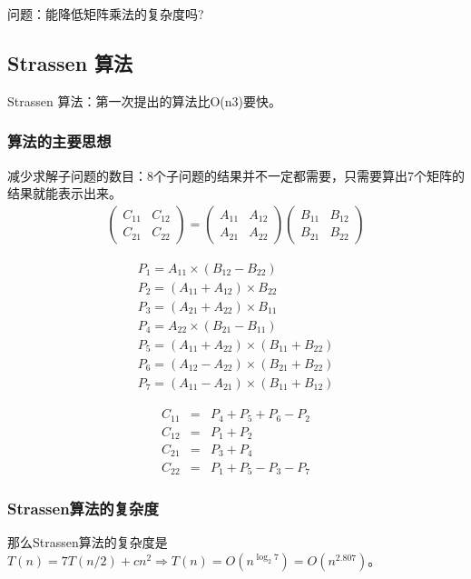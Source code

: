 	问题：能降低矩阵乘法的复杂度吗?
\subsection{Strassen 算法}
	Strassen 算法：第一次提出的算法比O(n3)要快。
	
\subsubsection{算法的主要思想}
	减少求解子问题的数目：8个子问题的结果并不一定都需要，只需要算出7个矩阵的结果就能表示出来。
\[ 
\begin{matrix}
\begin{pmatrix}
C_{11} & C_{12} \\ 
C_{21} & C_{22} 
\end{pmatrix}
=
\begin{pmatrix}
A_{11} & A_{12} \\ 
A_{21} & A_{22}  
\end{pmatrix}

\begin{pmatrix}
B_{11} & B_{12} \\ 
B_{21} & B_{22}  
 
\end{pmatrix}
    
\end{matrix}
\]

\begin{eqnarray}
P_1 = A_{11} \times (B_{12} - B_{22} ) \\
P_2 = ( A_{11} + A_{12} ) \times B_{22} \\
P_3 = ( A_{21} + A_{22} ) \times B_{11} \\
P_4 = A_{22} \times (B_{21} - B_{11} ) \\
P_5 = ( A_{11} + A_{22} ) \times (B_{11} + B_{22} ) \\
P_6 = (A_{12} - A_{22} )\times (B_{21} + B_{22} ) \\
P_7 = (A_{11} - A_{21} ) \times (B_{11} + B_{12} ) 
\end{eqnarray}



\begin{eqnarray}
C_{11} &=& P_4 + P_5 + P_6 - P_2  \\
C_{12} &=& P_1 + P_2\\
C_{21} &=& P_3 + P_4 \\
C_{22} &=& P_1 + P_5 - P_3 - P_7 
\end{eqnarray}

\subsubsection{Strassen算法的复杂度}
	那么Strassen算法的复杂度是$T(n)=7T(n/2) + cn^2 \Rightarrow T(n)=O(n^{\log_2 7}) = O(n^{2.807})$。

